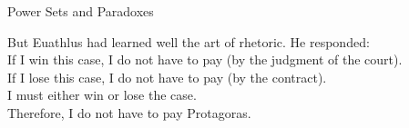 \begin{section}{Power Sets and Paradoxes}
\begin{problem}
\begin{enumerate}[label=\textrm{(\alph*)}]
\noindent But Euathlus had learned well the art of rhetoric. He responded:\\

\noindent If I win this case, I do not have to pay (by the judgment of the court).\\
If I lose this case, I do not have to pay (by the contract).\\
I must either win or lose the case.\\
Therefore, I do not have to pay Protagoras.
\end{enumerate}
\end{problem}

\end{section}